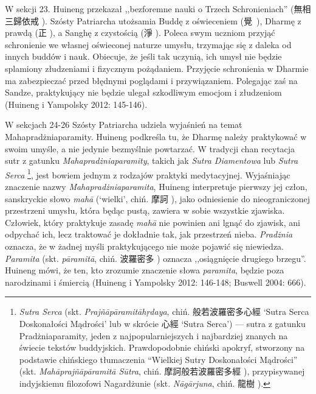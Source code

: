 W sekcji 23. Huineng przekazał ,,bezforemne nauki o Trzech Schronieniach\fnm'' (無相三歸依戒 ).
Szósty Patriarcha utożsamia Buddę z oświeceniem (覺~), Dharmę z prawdą (正 ), a Sanghę z czystością (淨 ).
Poleca swym uczniom przyjąć schronienie we własnej oświeconej naturze umysłu, trzymając się z daleka od innych buddów i nauk.
Obiecuje, że jeśli tak uczynią, ich umysł nie będzie splamiony złudzeniami i fizycznym pożądaniem.
Przyjęcie schronienia w Dharmie ma zabezpieczać przed błędnymi poglądami i przywiązaniem.
Polegając zaś na Sandze, praktykujący nie będzie ulegał szkodliwym emocjom i złudzeniom %
(Huineng i Yampolsky 2012: 145-146).

W sekcjach 24-26 Szósty Patriarcha udziela wyjaśnień na temat Mahapradżniaparamity.
Huineng podkreśla tu, że Dharmę należy praktykować w swoim umyśle, a nie jedynie bezmyślnie powtarzać.
W tradycji chan recytacja sutr z gatunku \textit{Mahapradżniaparamity}, takich jak \textit{Sutra Diamentowa} lub \textit{Sutra Serca}%
\footnote{\textit{Sutra Serca}\label{HeartSutra} (skt. \textit{Prajñāpāramitāh\d{r}daya}, chiń. 般若波羅密多心經  `Sutra Serca Doskonałości Mądrości' lub w skrócie 心經  `Sutra Serca') --- sutra z gatunku Pradżniaparamity, jeden z najpopularniejszych i najbardziej znanych na świecie tekstów buddyjskich. Prawdopodobnie chiński apokryf, stworzony na podstawie chińskiego tłumaczenia ``Wielkiej Sutry Doskonałości Mądrości'' (skt. \textit{Mahāprajñāpāramitā Sūtra}, chiń. 摩訶般若波羅密多經 ), przypisywanej indyjskiemu filozofowi Nagardżunie (skt. \textit{Nāgārjuna}, chiń. 龍樹 ).},
jest bowiem jednym z rodzajów praktyki medytacyjnej.
Wyjaśniając znaczenie nazwy \textit{Mahapradżniaparamita}, Huineng interpretuje pierwszy jej człon, sanskryckie słowo \textit{mahā} (`wielki', chiń. 摩訶 ), jako odniesienie do nieograniczonej przestrzeni umysłu, która będąc pustą, zawiera w sobie wszystkie zjawiska.
Człowiek, który praktykuje zasadę \textit{mahā} nie powinien ani lgnąć do zjawisk, ani odpychać ich, lecz traktować je dokładnie tak, jak przestrzeń nieba.
\textit{Pradżnia} oznacza, że w żadnej myśli praktykującego nie może pojawić się niewiedza.
\textit{Paramita} (skt. \textit{pāramitā}, chiń. 波羅密多 ) oznacza ,,osiągnięcie drugiego brzegu''.
Huineng mówi, że ten, kto zrozumie znaczenie słowa \textit{paramita}, będzie poza narodzinami i śmiercią
(Huineng i Yampolsky 2012: 146-148; Buswell 2004: 666).

